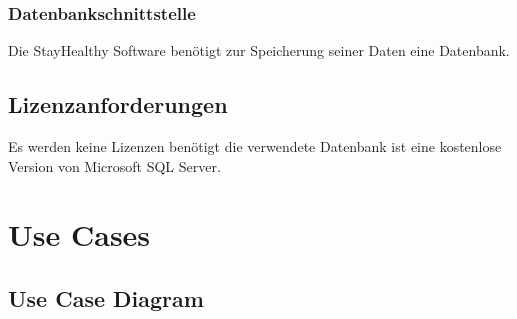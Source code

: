 \documentclass[12pt,a4paper,onecolumn]{article}
\begin{document}
\subsubsection{Datenbankschnittstelle}
Die StayHealthy Software benötigt zur Speicherung seiner Daten eine Datenbank.
\subsection{Lizenzanforderungen}
Es werden keine Lizenzen benötigt die verwendete Datenbank ist eine kostenlose Version von Microsoft SQL Server.

\section{Use Cases}
\subsection{Use Case Diagram}
\end{document}
